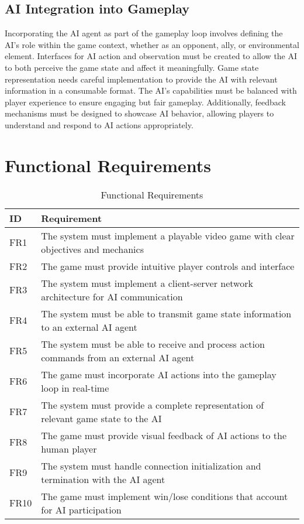 \subsection{AI Integration into Gameplay}
Incorporating the AI agent as part of the gameplay loop involves defining the AI's role within the game context, whether as an opponent, ally, or environmental element. 
Interfaces for AI action and observation must be created to allow the AI to both perceive the game state and affect it meaningfully. 
Game state representation needs careful implementation to provide the AI with relevant information in a consumable format. The AI's capabilities must be balanced with player experience to ensure engaging but fair gameplay. 
Additionally, feedback mechanisms must be designed to showcase AI behavior, allowing players to understand and respond to AI actions appropriately.

\section{Functional Requirements}
\begin{table}[H]
    \centering
    \begin{tabular}{|p{}|p{}|}
        \hline
        \textbf{ID} & \textbf{Requirement} \\
        \hline
        FR1 & The system must implement a playable video game with clear objectives and mechanics \\
        \hline
        FR2 & The game must provide intuitive player controls and interface \\
        \hline
        FR3 & The system must implement a client-server network architecture for AI communication \\
        \hline
        FR4 & The system must be able to transmit game state information to an external AI agent \\
        \hline
        FR5 & The system must be able to receive and process action commands from an external AI agent \\
        \hline
        FR6 & The game must incorporate AI actions into the gameplay loop in real-time \\
        \hline
        FR7 & The system must provide a complete representation of relevant game state to the AI \\
        \hline
        FR8 & The game must provide visual feedback of AI actions to the human player \\
        \hline
        FR9 & The system must handle connection initialization and termination with the AI agent \\
        \hline
        FR10 & The game must implement win/lose conditions that account for AI participation \\
        \hline
    \end{tabular}
    \caption{Functional Requirements}
\end{table}

